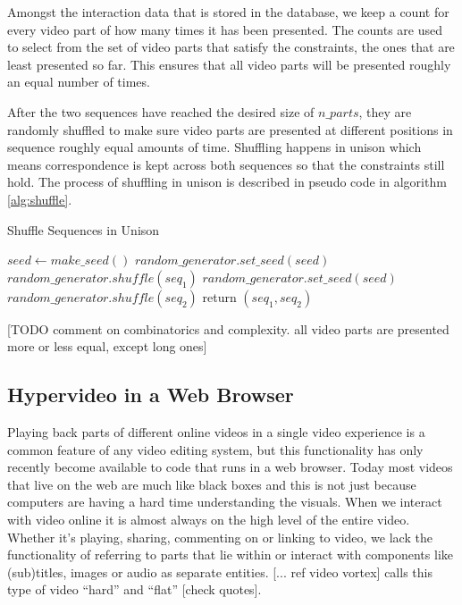 Amongst the interaction data that is stored in the database, we keep a count for every video part of how many times it has been presented. The counts are used to select from the set of video parts that satisfy the constraints, the ones that are least presented so far. This ensures that all video parts will be presented roughly an equal number of times.

After the two sequences have reached the desired size of $n\_parts$, they are randomly shuffled to make sure video parts are presented at different positions in sequence roughly equal amounts of time. Shuffling happens in unison which means correspondence is kept across both sequences so that the constraints still hold. The process of shuffling in unison is described in pseudo code in algorithm \ref{alg:shuffle}.

\begin{algorithm}
  \caption{Shuffle Sequences in Unison}
  \begin{algorithmic}[1]
      \State $seed \gets make\_seed()$ 
      \State $random\_generator.set\_seed(seed)$ 
      \State $random\_generator.shuffle(seq_1)$ 
      \State $random\_generator.set\_seed(seed)$ 
      \State $random\_generator.shuffle(seq_2)$ 
      \State return $(seq_1, seq_2)$
    \EndProcedure
  \end{algorithmic}
  \label{alg:shuffle}
\end{algorithm}

[TODO comment on combinatorics and complexity. all video parts are presented more or less equal, except long ones]

\subsection{Hypervideo in a Web Browser}

Playing back parts of different online videos in a single video experience is a common feature of any video editing system, but this functionality has only recently become available to code that runs in a web browser. Today most videos that live on the web are much like black boxes and this is not just because computers are having a hard time understanding the visuals. When we interact with video online it is almost always on the high level of the entire video. Whether it's playing, sharing, commenting on or linking to video, we lack the functionality of referring to parts that lie within or interact with components like (sub)titles, images or audio as separate entities. [... ref video vortex] calls this type of video ``hard'' and ``flat'' [check quotes].

